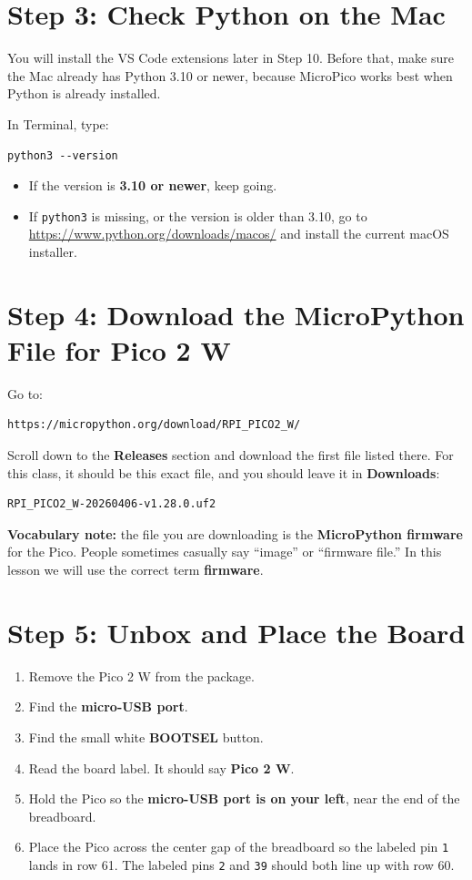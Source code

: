\documentclass[11pt,letterpaper]{article}
\begin{document}
\section*{Step 3: Check Python on the Mac}
You will install the VS Code extensions later in Step 10. Before that, make sure the Mac already has Python 3.10 or newer, because MicroPico works best when Python is already installed.

In Terminal, type:

\begin{verbatim}
python3 --version
\end{verbatim}

\begin{itemize}
    \item If the version is \textbf{3.10 or newer}, keep going.
    \item If \texttt{python3} is missing, or the version is older than 3.10, go to \url{https://www.python.org/downloads/macos/} and install the current macOS installer.
\end{itemize}

\section*{Step 4: Download the MicroPython File for Pico 2 W}
Go to:

\begin{verbatim}
https://micropython.org/download/RPI_PICO2_W/
\end{verbatim}

Scroll down to the \textbf{Releases} section and download the first file listed there. For this class, it should be this exact file, and you should leave it in \textbf{Downloads}:

\begin{verbatim}
RPI_PICO2_W-20260406-v1.28.0.uf2
\end{verbatim}

\textbf{Vocabulary note:} the file you are downloading is the \textbf{MicroPython firmware} for the Pico. People sometimes casually say ``image'' or ``firmware file.'' In this lesson we will use the correct term \textbf{firmware}.

\section*{Step 5: Unbox and Place the Board}
\begin{enumerate}
    \item Remove the Pico 2 W from the package.
    \item Find the \textbf{micro-USB port}.
    \item Find the small white \textbf{BOOTSEL} button.
    \item Read the board label. It should say \textbf{Pico 2 W}.
    \item Hold the Pico so the \textbf{micro-USB port is on your left}, near the end of the breadboard.
    \item Place the Pico across the center gap of the breadboard so the labeled pin \texttt{1} lands in row 61. The labeled pins \texttt{2} and \texttt{39} should both line up with row 60.
\end{enumerate}
\end{document}
